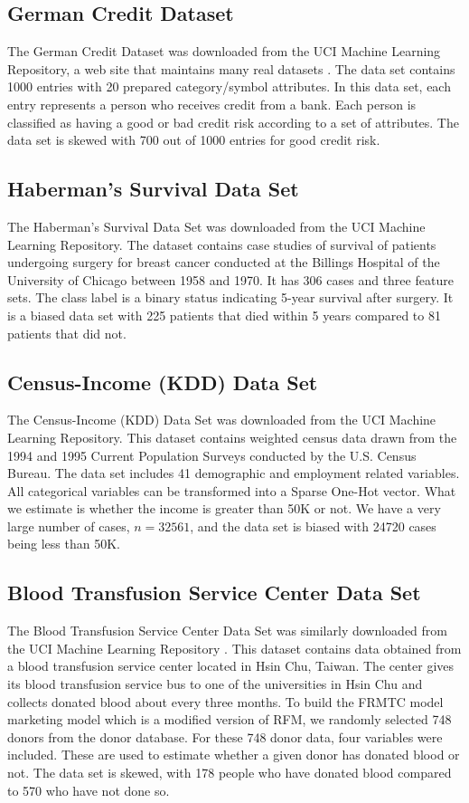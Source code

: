\subsection{German Credit Dataset}
The German Credit Dataset was downloaded from the UCI Machine Learning Repository, a web site that maintains many real datasets \cite{German}. The data set contains 1000 entries with 20 prepared category/symbol attributes. In this data set, each entry represents a person who receives credit from a bank. Each person is classified as having a good or bad credit risk according to a set of attributes. The data set is skewed with 700 out of 1000 entries for good credit risk. 


\subsection{Haberman's Survival Data Set}
The Haberman's Survival Data Set was downloaded from the UCI Machine Learning Repository\cite{Haberman}. The dataset contains case studies of survival of patients undergoing surgery for breast cancer conducted at the Billings Hospital of the University of Chicago between 1958 and 1970. It has 306 cases and three feature sets. The class label is a binary status indicating 5-year survival after surgery. It is a biased data set with 225 patients that died within 5 years compared to 81 patients that did not.


\subsection{Census-Income (KDD) Data Set}
The Census-Income (KDD) Data Set was downloaded from the UCI Machine Learning Repository\cite{Census}. This dataset contains weighted census data drawn from the 1994 and 1995 Current Population Surveys conducted by the U.S. Census Bureau. The data set includes 41 demographic and employment related variables. All categorical variables can be transformed into a Sparse One-Hot vector. What we estimate is whether the income is greater than 50K or not. We have a very large number of cases, $n = 32561$, and the data set is biased with 24720 cases being less than 50K.


\subsection{Blood Transfusion Service Center Data Set}
The Blood Transfusion Service Center Data Set was similarly downloaded from the UCI Machine Learning Repository \cite{Blood}. This dataset contains data obtained from a blood transfusion service center located in Hsin Chu, Taiwan. The center gives its blood transfusion service bus to one of the universities in Hsin Chu and collects donated blood about every three months. To build the FRMTC model marketing model which is a modified version of RFM, we randomly selected 748 donors from the donor database. For these 748 donor data, four variables were included. These are used to estimate whether a given donor has donated blood or not. The data set is skewed, with 178 people who have donated blood compared to 570 who have not done so.
\clearpage


